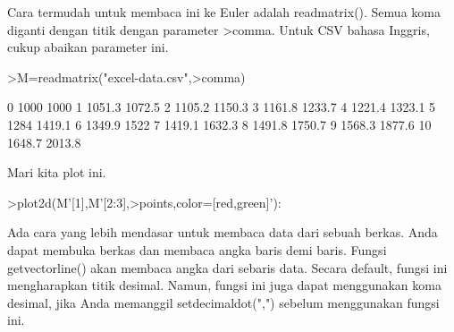 \documentclass[a4paper,10pt]{article}
\begin{document}
\begin{eulernotebook}
\begin{eulercomment}
Cara termudah untuk membaca ini ke Euler adalah readmatrix(). Semua
koma diganti dengan titik dengan parameter \textgreater{}comma. Untuk CSV bahasa
Inggris, cukup abaikan parameter ini.
\end{eulercomment}
\begin{eulerprompt}
>M=readmatrix("excel-data.csv",>comma)
\end{eulerprompt}
\begin{euleroutput}
          0      1000      1000 
          1    1051.3    1072.5 
          2    1105.2    1150.3 
          3    1161.8    1233.7 
          4    1221.4    1323.1 
          5      1284    1419.1 
          6    1349.9      1522 
          7    1419.1    1632.3 
          8    1491.8    1750.7 
          9    1568.3    1877.6 
         10    1648.7    2013.8 
\end{euleroutput}
\begin{eulercomment}
Mari kita plot ini.
\end{eulercomment}
\begin{eulerprompt}
>plot2d(M'[1],M'[2:3],>points,color=[red,green]'):
\end{eulerprompt}
\begin{eulercomment}
Ada cara yang lebih mendasar untuk membaca data dari sebuah berkas.
Anda dapat membuka berkas dan membaca angka baris demi baris. Fungsi
getvectorline() akan membaca angka dari sebaris data. Secara default,
fungsi ini mengharapkan titik desimal. Namun, fungsi ini juga dapat
menggunakan koma desimal, jika Anda memanggil setdecimaldot(",")
sebelum menggunakan fungsi ini.


\end{eulercomment}
\end{eulernotebook}
\end{document}
